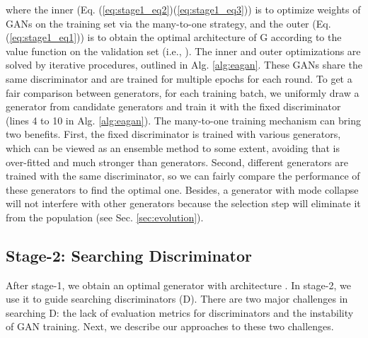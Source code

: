 \documentclass[runningheads]{llncs}
\begin{document}
\noindent where the inner (Eq. (\ref{eq:stage1_eq2})(\ref{eq:stage1_eq3})) is to optimize weights of  GANs on the training set via the many-to-one strategy, and the outer (Eq. (\ref{eq:stage1_eq1})) is to obtain the optimal architecture of G according to the value function on the validation set (i.e., ). The inner and outer optimizations are solved by iterative procedures, outlined in Alg. \ref{alg:eagan}. These  GANs share the same discriminator and are trained for multiple epochs for each round. To get a fair comparison between generators, for each training batch, we uniformly draw a generator from  candidate generators and train it with the fixed discriminator (lines 4 to 10 in Alg. \ref{alg:eagan}). The many-to-one training mechanism can bring two benefits. First, the fixed discriminator  is trained with various generators, which can be viewed as an ensemble method to some extent, avoiding that  is over-fitted and much stronger than generators. Second, different generators are trained with the same discriminator, so we can fairly compare the performance of these generators to find the optimal one. Besides, a generator with mode collapse will not interfere with other generators because the selection step will eliminate it from the population (see Sec. \ref{sec:evolution}).
















\subsection{Stage-2: Searching Discriminator}\label{sec:stage2}




After stage-1, we obtain an optimal generator  with architecture . In stage-2, we use it to guide searching discriminators (D). There are two major challenges in searching D: the lack of evaluation metrics for discriminators and the instability of GAN training. Next, we describe our approaches to these two challenges.
\end{document}
